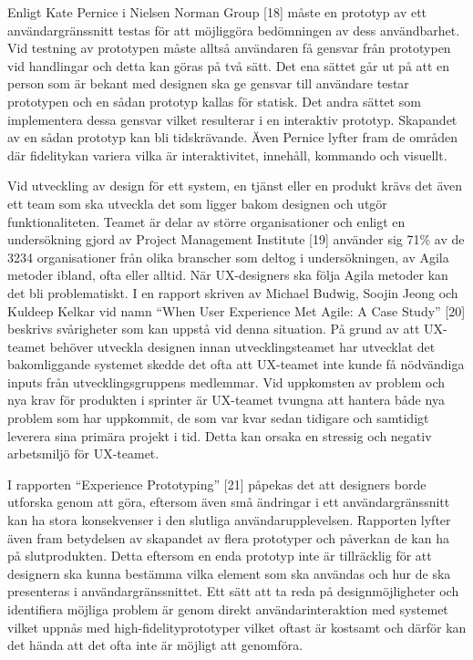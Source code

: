 \documentclass[12pt]{kththesis}
\begin{document}
Enligt Kate Pernice i Nielsen Norman Group [18] måste en prototyp av ett användargränssnitt testas för att möjliggöra bedömningen av dess användbarhet. Vid testning av prototypen måste alltså användaren få gensvar från prototypen vid handlingar och detta kan göras på två sätt. Det ena sättet går ut på att en person som är bekant med designen ska ge gensvar till användare testar prototypen och en sådan prototyp kallas för statisk. Det andra sättet som implementera dessa gensvar vilket resulterar i en interaktiv prototyp. Skapandet av en sådan prototyp kan bli tidskrävande. Även Pernice lyfter fram de områden där fidelitykan variera vilka är interaktivitet, innehåll, kommando och visuellt. 

Vid utveckling av design för ett system, en tjänst eller en produkt krävs det även ett team som ska utveckla det som ligger bakom designen och utgör funktionaliteten. Teamet är delar av större organisationer och enligt en undersökning gjord av Project Management Institute [19] använder sig 71\% av de 3234 organisationer från olika branscher som deltog i undersökningen, av Agila metoder ibland, ofta eller alltid. När UX-designers ska följa Agila metoder kan det bli problematiskt. I en rapport skriven av Michael Budwig, Soojin Jeong och Kuldeep Kelkar vid namn “When User Experience Met Agile: A Case Study” [20] beskrivs svårigheter som kan uppstå vid denna situation. På grund av att UX-teamet behöver utveckla designen innan utvecklingsteamet har utvecklat det bakomliggande systemet skedde det ofta att UX-teamet inte kunde få nödvändiga inputs från utvecklingsgruppens medlemmar. Vid uppkomsten av problem och nya krav för produkten i sprinter är UX-teamet tvungna att hantera både nya problem som har uppkommit, de som var kvar sedan tidigare och samtidigt leverera sina primära projekt i tid. Detta kan orsaka en stressig och negativ arbetsmiljö för UX-teamet. 

I rapporten “Experience Prototyping” [21] påpekas det att designers borde utforska genom att göra, eftersom även små ändringar i ett användargränssnitt kan ha stora konsekvenser i den slutliga användarupplevelsen. Rapporten lyfter även fram betydelsen av skapandet av flera prototyper och påverkan de kan ha på slutprodukten. Detta eftersom en enda prototyp inte är tillräcklig för att designern ska kunna bestämma vilka element som ska användas och hur de ska presenteras i användargränssnittet. Ett sätt att ta reda på designmöjligheter och identifiera möjliga problem är genom direkt användarinteraktion med systemet vilket uppnås med high-fidelityprototyper vilket oftast är kostsamt och därför kan det hända att det ofta inte är möjligt att genomföra.
\end{document}
